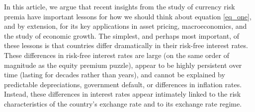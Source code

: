 \documentclass{ar-1col}
\begin{document}
In this article, we argue that recent insights from the study of currency risk premia have important lessons for how we should think about equation \ref{eq_one}, and by extension, for its key applications in asset pricing, macroeconomics, and the study of economic growth. The simplest, and perhaps most important, of these lessons is that countries differ dramatically in their risk-free interest rates. These differences in risk-free interest rates are large (on the same order of magnitude as the equity premium puzzle), appear to be highly persistent over time (lasting for decades rather than years), and cannot be explained by predictable depreciations, government default, or differences in inflation rates. Instead, these differences in interest rates appear intimately linked to the risk characteristics of the country's exchange rate and to its exchange rate regime.
\end{document}
